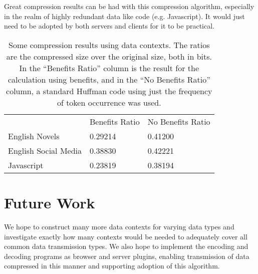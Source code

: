 Great compression results can be had with this compression algorithm, especially in the realm of highly redundant data like code (e.g. Javascript). It would just need to be adopted by both servers and clients for it to be practical. 

\begin{table}[h]
\centering
\caption[Compression Results]{Some compression results using data contexts. The ratios are the compressed size over the original size, both in bits. In the ``Benefits Ratio'' column is the result for the calculation using benefits, and in the ``No Benefits Ratio'' column, a standard Huffman code using just the frequency of token occurrence was used.}
\label{table:compressionResults}
\begin{tabular}{lll}
                     & Benefits Ratio & No Benefits Ratio \\
English Novels       & 0.29214        & 0.41200           \\
English Social Media & 0.38830        & 0.42221           \\
Javascript           & 0.23819        & 0.38194          
\end{tabular}
\end{table}

\section{Future Work}
We hope to construct many more data contexts for varying data types and investigate exactly how many contexts would be needed to adequately cover all common data transmission types. We also hope to implement the encoding and decoding programs as browser and server plugins, enabling transmission of data compressed in this manner and supporting adoption of this algorithm.

